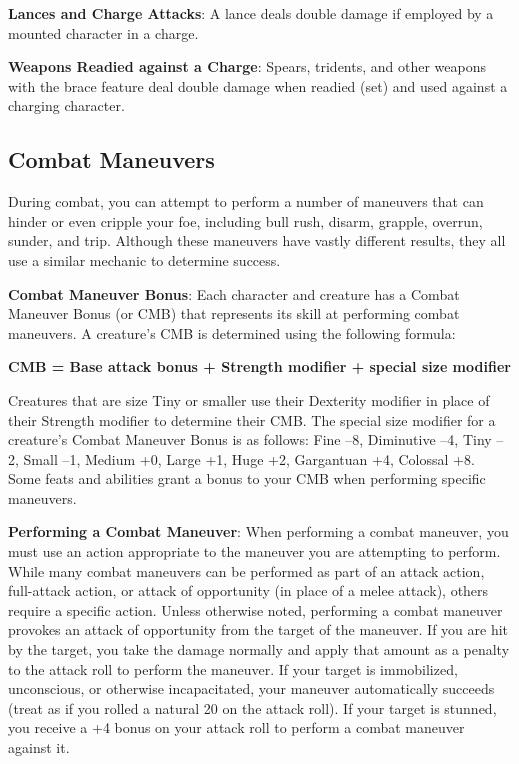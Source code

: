 \textbf{Lances and Charge Attacks}: A lance deals double damage if employed by a mounted character in a charge.
				
\textbf{Weapons Readied against a Charge}: Spears, tridents, and other weapons with the brace feature deal double damage when readied (set) and used against a charging character.
				
\subsection{Combat Maneuvers}

				
During combat, you can attempt to perform a number of maneuvers that can hinder or even cripple your foe, including bull rush, disarm, grapple, overrun, sunder, and trip. Although these maneuvers have vastly different results, they all use a similar mechanic to determine success.
				
\textbf{Combat Maneuver Bonus}: Each character and creature has a Combat Maneuver Bonus (or CMB) that represents its skill at performing combat maneuvers. A creature's CMB is determined using the following formula:
				
{\large \textbf{CMB = Base attack bonus + Strength modifier + special size modifier}}
				
Creatures that are size Tiny or smaller use their Dexterity modifier in place of their Strength modifier to determine their CMB. The special size modifier for a creature's Combat Maneuver Bonus is as follows: Fine --8, Diminutive --4, Tiny --2, Small --1, Medium +0, Large +1, Huge +2, Gargantuan +4, Colossal +8. Some feats and abilities grant a bonus to your CMB when performing specific maneuvers.
				
\textbf{Performing a Combat Maneuver}: When performing a combat maneuver, you must use an action appropriate to the maneuver you are attempting to perform. While many combat maneuvers can be performed as part of an attack action, full-attack action, or attack of opportunity (in place of a melee attack), others require a specific action. Unless otherwise noted, performing a combat maneuver provokes an attack of opportunity from the target of the maneuver. If you are hit by the target, you take the damage normally and apply that amount as a penalty to the attack roll to perform the maneuver. If your target is immobilized, unconscious, or otherwise incapacitated, your maneuver automatically succeeds (treat as if you rolled a natural 20 on the attack roll). If your target is stunned, you receive a +4 bonus on your attack roll to perform a combat maneuver against it. 
				
